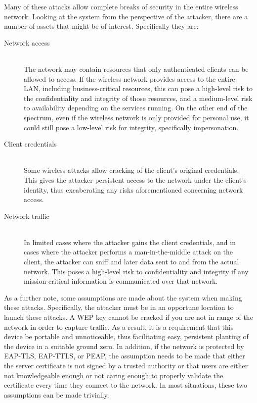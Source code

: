 \documentclass[journal, compsoc]{IEEEtran}
\begin{document}
Many of these attacks allow complete breaks of security in the entire
wireless network. Looking at the system from the perspective of the
attacker, there are a number of assets that might be of
interest. Specifically they are:

\begin{description}
\item[Network access] \hfill \\
  The network may contain resources that only authenticated clients
  can be allowed to access. If the wireless network provides access to
  the entire LAN, including business-critical resources, this can pose
  a high-level risk to the confidentiality and integrity of those
  resources, and a medium-level risk to availability depending on the
  services running. On the other end of the spectrum, even if the
  wireless network is only provided for personal use, it could still
  pose a low-level risk for integrity, specifically impersonation.

\item[Client credentials] \hfill \\
  Some wireless attacks allow cracking of the client's original
  credentials. This gives the attacker persistent access to the
  network under the client's identity, thus excaberating any risks
  aforementioned concerning network access.

\item[Network traffic] \hfill \\
  In limited cases where the attacker gains the client credentials,
  and in cases where the attacker performs a man-in-the-middle attack
  on the client, the attacker can sniff and later data sent to and
  from the actual network. This poses a high-level risk to
  confidentiality and integrity if any mission-critical information is
  communicated over that network.
\end{description}

As a further note, some assumptions are made about the system when
making these attacks. Specifically, the attacker must be in an
opportune location to launch these attacks. A WEP key cannot be
cracked if you are not in range of the network in order to capture
traffic. As a result, it is a requirement that this device be portable
and unnoticeable, thus facilitating easy, persistent planting of the
device in a suitable ground zero. In addition, if the network is
protected by EAP-TLS, EAP-TTLS, or PEAP, the assumption needs to be
made that either the server certificate is not signed by a trusted
authority or that users are either not knowledgeable enough or not
caring enough to properly validate the certificate every time they
connect to the network. In most situations, these two assumptions can
be made trivially.
\end{document}
